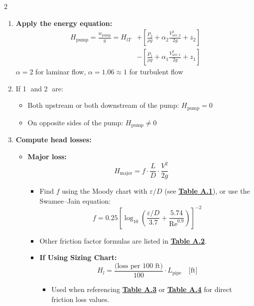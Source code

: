 \begin{multicols*}{2}
\begin{enumerate}
        \item \textbf{Apply the energy equation:}
              \begin{align*}
                  H_{\text{pump}} = \frac{w_{\text{pump}}}{g} = H_{lT} & + \left[ \frac{P_2}{\rho g} + \alpha_2 \frac{V_{\text{ave},2}^2}{2g} + z_2 \right] \\
                                                                       & - \left[ \frac{P_1}{\rho g} + \alpha_1 \frac{V_{\text{ave},1}^2}{2g} + z_1 \right]
              \end{align*}
              $\alpha = 2$ for laminar flow, $\alpha = 1.06 \approx 1$ for turbulent flow
        \item If \textcircled{1} and \textcircled{2} are:
              \begin{itemize}
                  \item Both upstream or both downstream of the pump: $H_{\text{pump}} = 0$
                  \item On opposite sides of the pump: $H_{\text{pump}} \neq 0$
              \end{itemize}
              \item \textbf{Compute head losses:}
              \begin{itemize}
                  \item \textbf{Major loss:}
                  \[
                      H_{\text{major}} = f \cdot \frac{L}{D} \cdot \frac{V^2}{2g}
                  \]
                  \begin{itemize}
                      \item Find $f$ using the Moody chart with $\varepsilon/D$ (see \underline{\textbf{Table A.1}}), or use the Swamee–Jain equation:
                      \[
                          f = 0.25 \left[ \log_{10} \left( \frac{\varepsilon/D}{3.7} + \frac{5.74}{\text{Re}^{0.9}} \right) \right]^{-2}
                      \]
                      \item Other friction factor formulas are listed in \underline{\textbf{Table A.2}}.
                      \item \textbf{If Using Sizing Chart:}
                      \[
                          H_{l} = \frac{\text{(loss per 100 ft)}}{100} \cdot L_{\text{pipe}} \quad \text{[ft]}
                      \]
                      \begin{itemize}
                          \item Used when referencing \underline{\textbf{Table A.3}} or \underline{\textbf{Table A.4}} for direct friction loss values.
                      \end{itemize}
                  \end{itemize}
              

\end{itemize}
\end{enumerate}
\end{multicols*}

